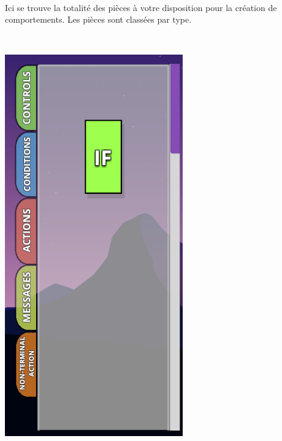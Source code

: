 \documentclass{report}
\begin{document}
\begin{minipage}{0.4\linewidth}
\paragraph{}
Ici se trouve la totalité des pièces à votre disposition pour la création de comportements.
Les pièces sont classées par type.
\end{minipage}
\begin{minipage}{0.2\linewidth}
\
\end{minipage}
\begin{minipage}{0.4\linewidth}
\includegraphics[scale=0.40]{Pieces}
\end{minipage}\hfill
\end{document}
